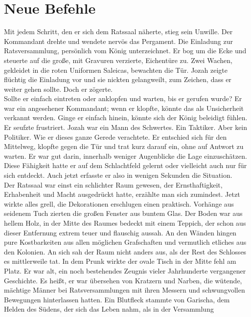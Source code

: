 
\chapter{Neue Befehle}

Mit jedem Schritt, den er sich dem Ratssaal näherte, stieg sein Unwille. Der Kommandant drehte und 
wendete nervös das Pergament. Die Einladung zur Ratsversammlung, persönlich vom König unterzeichnet. 
Er bog um die Ecke und steuerte auf die große, mit Gravuren verzierte, Eichentüre zu. Zwei Wachen, 
gekleidet in die roten Uniformen Saleicas, bewachten die Tür. Jozah zeigte flüchtig die Einladung 
vor und sie nickten gelangweilt, zum Zeichen, dass er weiter gehen sollte. Doch er zögerte.\\
 Sollte er einfach eintreten oder anklopfen und warten, bis er gerufen wurde? Er war ein angesehener 
Kommandant; wenn er klopfte, könnte das als Unsicherheit verkannt werden. Ginge er einfach hinein, 
könnte sich der König beleidigt fühlen. Er seufzte frustriert. Jozah war ein Mann des Schwertes. Ein 
Taktiker. Aber kein Politiker. Wie er dieses ganze Gerede verachtete. Er entschied sich für den 
Mittelweg, klopfte gegen die Tür und trat kurz darauf ein, ohne auf Antwort zu warten. Er war gut 
darin, innerhalb weniger Augenblicke die Lage einzuschätzen. Diese Fähigkeit hatte er auf dem 
Schlachtfeld gelernt oder vielleicht auch nur für sich entdeckt. Auch jetzt erfasste er also in 
wenigen Sekunden die Situation.\\
 Der Ratssaal war einst ein schlichter Raum gewesen, der Ernsthaftigkeit, Erhabenheit und Macht 
ausgedrückt hatte, erzählte man sich zumindest. Jetzt wirkte alles grell, die Dekorationen 
erschlugen einen praktisch. Vorhänge aus seidenem Tuch zierten die großen Fenster aus buntem Glas. 
Der Boden war aus hellem Holz, in der Mitte des Raumes bedeckt mit einem Teppich, der schon aus 
dieser Entfernung extrem teuer und flauschig aussah. An den Wänden hingen pure Kostbarkeiten aus 
allen möglichen Grafschaften und vermutlich etliches aus den Kolonien. An sich sah der Raum nicht 
anders aus, als der Rest des Schlosses es mittlerweile tat. In dem Prunk wirkte der ovale Tisch in 
der Mitte fehl am Platz. Er war alt, ein noch bestehendes Zeugnis vieler Jahrhunderte vergangener 
Geschichte. Es heißt, er war übersehen von Kratzern und Narben, die wütende, mächtige Männer bei 
Ratsversammlungen mit ihren Messern und schwungvollen Bewegungen hinterlassen hatten. Ein Blutfleck 
stammte von Garischa, dem Helden des Südens, der sich das Leben nahm, als in der Versammlung 
